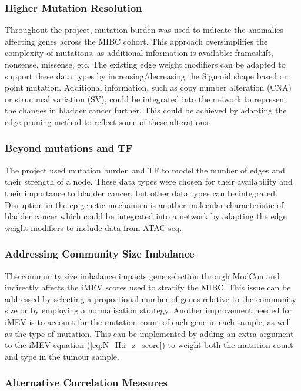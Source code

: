 \subsubsection*{Higher Mutation Resolution}

Throughout the project, mutation burden was used to indicate the anomalies affecting genes across the MIBC cohort. This approach oversimplifies the complexity of mutations, as additional information is available: frameshift, nonsense, missense, etc. The existing edge weight modifiers can be adapted to support these data types by increasing/decreasing the Sigmoid shape based on point mutation. Additional information, such as copy number alteration (CNA) or structural variation (SV), could be integrated into the network to represent the changes in bladder cancer further. This could be achieved by adapting the edge pruning method to reflect some of these alterations.

\subsubsection*{Beyond mutations and TF}

The project used mutation burden and TF to model the number of edges and their strength of a node. These data types were chosen for their availability and their importance to bladder cancer, but other data types can be integrated. Disruption in the epigenetic mechanism is another molecular characteristic of bladder cancer \citep{Robertson2017-mg,Tcga2014-dr} which could be integrated into a network by adapting the edge weight modifiers to include data from ATAC-seq.


\subsubsection*{Addressing Community Size Imbalance}

The community size imbalance impacts gene selection through ModCon and indirectly affects the iMEV scores used to stratify the MIBC. This issue can be addressed by selecting a proportional number of genes relative to the community size or by employing a normalisation strategy. Another improvement needed for iMEV is to account for the mutation count of each gene in each sample, as well as the type of mutation. This can be implemented by adding an extra argument to the iMEV equation (\cref{eq:N_II:i_z_score}) to weight both the mutation count and type in the tumour sample.


\subsubsection*{Alternative Correlation Measures}

